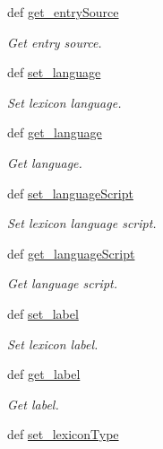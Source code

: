 \begin{DoxyCompactItemize}
def \hyperlink{classlmf_1_1src_1_1core_1_1lexicon_1_1_lexicon_aae478dac54b901f7ee7726090488c27d}{get\+\_\+entry\+Source}
\begin{DoxyCompactList}\small\item\em Get entry source. \end{DoxyCompactList}\item 
def \hyperlink{classlmf_1_1src_1_1core_1_1lexicon_1_1_lexicon_a5d7bcec0eb2b092781b4cc5a457fdb44}{set\+\_\+language}
\begin{DoxyCompactList}\small\item\em Set lexicon language. \end{DoxyCompactList}\item 
def \hyperlink{classlmf_1_1src_1_1core_1_1lexicon_1_1_lexicon_aaf09bad461dfbece7e9a969e3a2e6930}{get\+\_\+language}
\begin{DoxyCompactList}\small\item\em Get language. \end{DoxyCompactList}\item 
def \hyperlink{classlmf_1_1src_1_1core_1_1lexicon_1_1_lexicon_ad23ed7152a59fe7a661e01e04a24c9ce}{set\+\_\+language\+Script}
\begin{DoxyCompactList}\small\item\em Set lexicon language script. \end{DoxyCompactList}\item 
def \hyperlink{classlmf_1_1src_1_1core_1_1lexicon_1_1_lexicon_a92f3732b1a50f779310b88ac37dfdb13}{get\+\_\+language\+Script}
\begin{DoxyCompactList}\small\item\em Get language script. \end{DoxyCompactList}\item 
def \hyperlink{classlmf_1_1src_1_1core_1_1lexicon_1_1_lexicon_a917f604c598a5bc7c286b5044b2ce1ff}{set\+\_\+label}
\begin{DoxyCompactList}\small\item\em Set lexicon label. \end{DoxyCompactList}\item 
def \hyperlink{classlmf_1_1src_1_1core_1_1lexicon_1_1_lexicon_aa91f2f54a4325e43bf78158e771ef77b}{get\+\_\+label}
\begin{DoxyCompactList}\small\item\em Get label. \end{DoxyCompactList}\item 
def \hyperlink{classlmf_1_1src_1_1core_1_1lexicon_1_1_lexicon_a8720140f0bca0724676930be5adcb65d}{set\+\_\+lexicon\+Type}

\end{DoxyCompactItemize}
